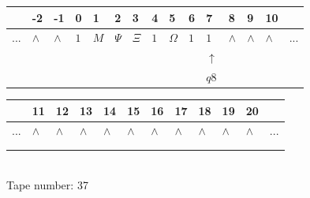 \documentclass[11pt]{article}
\begin{document}
\begin{table}[H]
\centering
\begin{tabular}{lllllllllllllll}
 & -2 & -1 & 0 & 1 & 2 & 3 & 4 & 5 & 6 & 7 & 8 & 9 & 10 & \\
\hline
$...$ & \multicolumn{1}{|l|}{$\wedge$} & \multicolumn{1}{|l|}{$\wedge$} & \multicolumn{1}{|l|}{$1$} & \multicolumn{1}{|l|}{$M$} & \multicolumn{1}{|l|}{$\Psi$} & \multicolumn{1}{|l|}{$\Xi$} & \multicolumn{1}{|l|}{$1$} & \multicolumn{1}{|l|}{$\Omega$} & \multicolumn{1}{|l|}{$1$} & \multicolumn{1}{|l|}{$1$} & \multicolumn{1}{|l|}{$\wedge$} & \multicolumn{1}{|l|}{$\wedge$} & \multicolumn{1}{|l|}{$\wedge$} & $...$\\
\hline
&  &  &  &  &  &  &  &  &  & $\uparrow$ &  &  &  &  \\
&  &  &  &  &  &  &  &  &  & $ q8 $ &  &  &  &  \\
\end{tabular}
\begin{tabular}{llllllllllll}
 & 11 & 12 & 13 & 14 & 15 & 16 & 17 & 18 & 19 & 20 & \\
\hline
$...$ & \multicolumn{1}{|l|}{$\wedge$} & \multicolumn{1}{|l|}{$\wedge$} & \multicolumn{1}{|l|}{$\wedge$} & \multicolumn{1}{|l|}{$\wedge$} & \multicolumn{1}{|l|}{$\wedge$} & \multicolumn{1}{|l|}{$\wedge$} & \multicolumn{1}{|l|}{$\wedge$} & \multicolumn{1}{|l|}{$\wedge$} & \multicolumn{1}{|l|}{$\wedge$} & \multicolumn{1}{|l|}{$\wedge$} & $...$\\
\hline
&  &  &  &  &  &  &  &  &  &  &  \\
&  &  &  &  &  &  &  &  &  &  &  \\
\end{tabular}
\\
Tape number: 37
\noindent\makebox[\linewidth]{\hdashrule{\textwidth}{1pt}{1pt}}\end{table}
\end{document}

